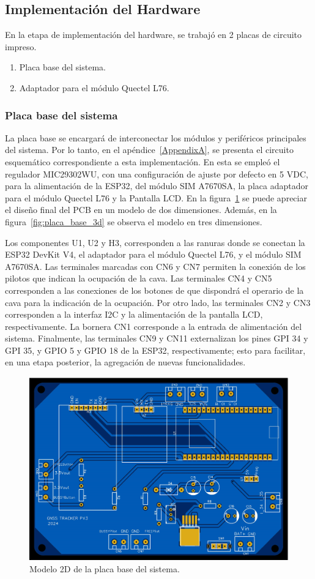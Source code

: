 \subsection{Implementación del Hardware}

En la etapa de implementación del hardware, se trabajó en 2 placas de circuito impreso. 

\begin{enumerate}
    \item Placa base del sistema.
    \item Adaptador para el módulo Quectel L76.
\end{enumerate}



\subsubsection{Placa base del sistema}

La placa base se encargará de interconectar los módulos y periféricos principales del sistema. Por lo tanto, en el apéndice~\ref{AppendixA}, se presenta el circuito esquemático correspondiente a esta implementación. En esta se empleó el regulador MIC29302WU, con una configuración de ajuste por defecto en 5 VDC, para la alimentación de la ESP32, del módulo SIM A7670SA, la placa adaptador para el módulo Quectel L76 y la Pantalla LCD. En la figura~\ref{fig:placa_base_2d} se puede apreciar el diseño final del PCB en un modelo de dos dimensiones. Además, en la figura~\ref{fig:placa_base_3d} se observa el modelo en tres dimensiones. 

Los componentes U1, U2 y H3, corresponden a las ranuras donde se conectan la ESP32 DevKit V4, el adaptador para el módulo Quectel L76, y el módulo SIM A7670SA. Las terminales marcadas con CN6 y CN7 permiten la conexión de los pilotos que indican la ocupación de la cava. Las terminales CN4 y CN5 corresponden a las conexiones de los botones de que dispondrá el operario de la cava para la indicación de la ocupación. Por otro lado, las terminales CN2 y CN3 corresponden a la interfaz I2C y la alimentación de la pantalla LCD, respectivamente. La bornera CN1 corresponde a la entrada de alimentación del sistema. Finalmente, las terminales CN9 y CN11 externalizan los pines GPI 34 y GPI 35, y GPIO 5 y GPIO 18 de la ESP32, respectivamente; esto para facilitar, en una etapa posterior, la agregación de nuevas funcionalidades. 

\begin{figure}[htbp]
	\centering
	\includegraphics[width=.5\textwidth]{./Figures/PCB_TFE_Modelo_2D.png}
	\caption{Modelo 2D de la placa base del sistema.}
	\label{fig:placa_base_2d}
\end{figure}

